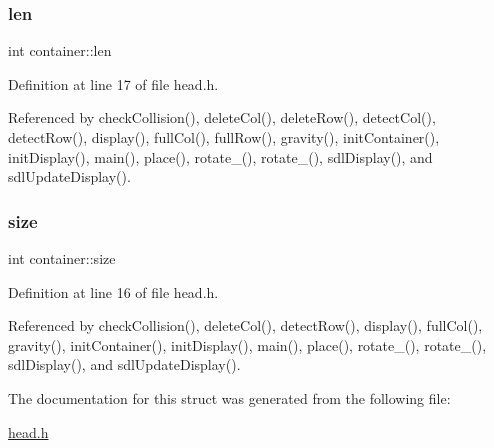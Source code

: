 \mbox{\label{structcontainer_a0069496fb95c879cd33fb79ab726e81a}} 
\subsubsection{\texorpdfstring{len}{len}}
{\footnotesize\ttfamily int container\+::len}



Definition at line 17 of file head.\+h.



Referenced by check\+Collision(), delete\+Col(), delete\+Row(), detect\+Col(), detect\+Row(), display(), full\+Col(), full\+Row(), gravity(), init\+Container(), init\+Display(), main(), place(), rotate\+\_(), rotate\+\_(), sdl\+Display(), and sdl\+Update\+Display().

\mbox{\label{structcontainer_a1e938d250074e70b9778df1b59121744}} 
\subsubsection{\texorpdfstring{size}{size}}
{\footnotesize\ttfamily int container\+::size}



Definition at line 16 of file head.\+h.



Referenced by check\+Collision(), delete\+Col(), detect\+Row(), display(), full\+Col(), gravity(), init\+Container(), init\+Display(), main(), place(), rotate\+\_(), rotate\+\_(), sdl\+Display(), and sdl\+Update\+Display().



The documentation for this struct was generated from the following file\+:\begin{DoxyCompactItemize}
\item 
\hyperlink{head_8h}{head.\+h}\end{DoxyCompactItemize}
